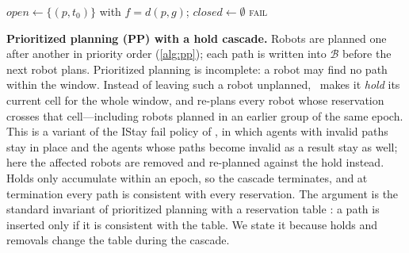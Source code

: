 \begin{algorithm}[t]
\caption{Windowed space-time A* (one robot)}\label{alg:astar}
$\mathit{open}\gets\{(p,t_0)\}$ with $f=d(p,g)$; $\mathit{closed}\gets\emptyset$\;
\Return \textsc{fail}\;
\end{algorithm}

\noindent\textbf{Prioritized planning (PP) with a hold cascade.}
Robots are planned one after another in priority order
(\cref{alg:pp}); each path is written into $\mathcal{B}$ before the next
robot plans. Prioritized planning is incomplete: a robot may find no path
within the window. Instead of leaving such a robot unplanned, \sname\ makes it
\emph{hold} its current cell for the whole window, and re-plans every robot
whose reservation crosses that cell---including robots planned in an earlier
group of the same epoch. This is a variant of the IStay fail policy of
\citet{morag2023adapting}, in which agents with invalid paths stay in place
and the agents whose paths become invalid as a result stay as well; here the
affected robots are removed and re-planned against the hold instead.
Holds only accumulate within an epoch, so the cascade
terminates, and at termination every path is consistent with every
reservation. The argument is the standard invariant of prioritized planning
with a reservation table \citep{erdmann1987multiple,silver2005cooperative}:
a path is inserted only if it is consistent with the table. We state it
because holds and removals change the table during the cascade.

